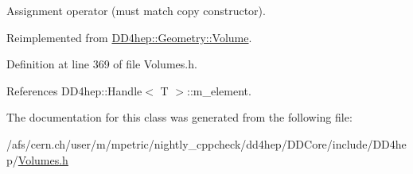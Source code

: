 Assignment operator (must match copy constructor). 

Reimplemented from \hyperlink{class_d_d4hep_1_1_geometry_1_1_volume_af071e34d365d16c7f7dfe5b2fe59d520}{DD4hep::Geometry::Volume}.

Definition at line 369 of file Volumes.h.

References DD4hep::Handle$<$ T $>$::m\_\-element.

The documentation for this class was generated from the following file:\begin{DoxyCompactItemize}
\item 
/afs/cern.ch/user/m/mpetric/nightly\_\-cppcheck/dd4hep/DDCore/include/DD4hep/\hyperlink{_volumes_8h}{Volumes.h}\end{DoxyCompactItemize}
